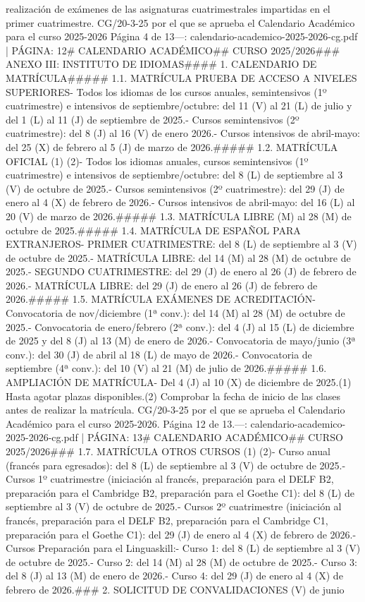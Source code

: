 \documentclass{article}
\begin{document}
\begin{itemize}
{realización de exámenes de las asignaturas cuatrimestrales impartidas en el primer cuatrimestre.\n{} CG/20-3-25 por el que se aprueba el Calendario Académico para el curso 2025-2026  Página 4 de 13\n\n---\n\nFUENTE: calendario-academico-2025-2026-cg.pdf | PÁGINA: 12\n# CALENDARIO ACADÉMICO\n## CURSO 2025/2026\n\n### ANEXO III: INSTITUTO DE IDIOMAS\n\n#### 1. CALENDARIO DE MATRÍCULA\n\n##### 1.1. MATRÍCULA PRUEBA DE ACCESO A NIVELES SUPERIORES\n\n- Todos los idiomas de los cursos anuales, semintensivos (1º cuatrimestre) e intensivos de septiembre/octubre: del 11 (V) al 21 (L) de julio y del 1 (L) al 11 (J) de septiembre de 2025.\n- Cursos semintensivos (2º cuatrimestre): del 8 (J) al 16 (V) de enero 2026.\n- Cursos intensivos de abril-mayo: del 25 (X) de febrero al 5 (J) de marzo de 2026.\n\n##### 1.2. MATRÍCULA OFICIAL (1) (2)\n\n- Todos los idiomas anuales, cursos semintensivos (1º cuatrimestre) e intensivos de septiembre/octubre: del 8 (L) de septiembre al 3 (V) de octubre de 2025.\n- Cursos semintensivos (2º cuatrimestre): del 29 (J) de enero al 4 (X) de febrero de 2026.\n- Cursos intensivos de abril-mayo: del 16 (L) al 20 (V) de marzo de 2026.\n\n##### 1.3. MATRÍCULA LIBRE\n{} (M) al 28 (M) de octubre de 2025.\n\n##### 1.4. MATRÍCULA DE ESPAÑOL PARA EXTRANJEROS\n\n- PRIMER CUATRIMESTRE: del 8 (L) de septiembre al 3 (V) de octubre de 2025.\n- MATRÍCULA LIBRE: del 14 (M) al 28 (M) de octubre de 2025.\n- SEGUNDO CUATRIMESTRE: del 29 (J) de enero al 26 (J) de febrero de 2026.\n- MATRÍCULA LIBRE: del 29 (J) de enero al 26 (J) de febrero de 2026.\n\n##### 1.5. MATRÍCULA EXÁMENES DE ACREDITACIÓN\n\n- Convocatoria de nov/diciembre (1ª conv.): del 14 (M) al 28 (M) de octubre de 2025.\n- Convocatoria de enero/febrero (2ª conv.): del 4 (J) al 15 (L) de diciembre de 2025 y del 8 (J) al 13 (M) de enero de 2026.\n- Convocatoria de mayo/junio (3ª conv.): del 30 (J) de abril al 18 (L) de mayo de 2026.\n- Convocatoria de septiembre (4ª conv.): del 10 (V) al 21 (M) de julio de 2026.\n\n##### 1.6. AMPLIACIÓN DE MATRÍCULA\n\n- Del 4 (J) al 10 (X) de diciembre de 2025.\n\n(1) Hasta agotar plazas disponibles.\n(2) Comprobar la fecha de inicio de las clases antes de realizar la matrícula.\n{} CG/20-3-25 por el que se aprueba el Calendario Académico para el curso 2025-2026. Página 12 de 13.\n\n---\n\nFUENTE: calendario-academico-2025-2026-cg.pdf | PÁGINA: 13\n# CALENDARIO ACADÉMICO\n## CURSO 2025/2026\n\n### 1.7. MATRÍCULA OTROS CURSOS (1) (2)\n\n- Curso anual (francés para egresados): del 8 (L) de septiembre al 3 (V) de octubre de 2025.\n- Cursos 1º cuatrimestre (iniciación al francés, preparación para el DELF B2, preparación para el Cambridge B2, preparación para el Goethe C1): del 8 (L) de septiembre al 3 (V) de octubre de 2025.\n- Cursos 2º cuatrimestre (iniciación al francés, preparación para el DELF B2, preparación para el Cambridge C1, preparación para el Goethe C1): del 29 (J) de enero al 4 (X) de febrero de 2026.\n- Cursos Preparación para el Linguaskill:\n- Curso 1: del 8 (L) de septiembre al 3 (V) de octubre de 2025.\n- Curso 2: del 14 (M) al 28 (M) de octubre de 2025.\n- Curso 3: del 8 (J) al 13 (M) de enero de 2026.\n- Curso 4: del 29 (J) de enero al 4 (X) de febrero de 2026.\n\n### 2. SOLICITUD DE CONVALIDACIONES\n{} (V) de junio }
\end{itemize}
\end{document}
